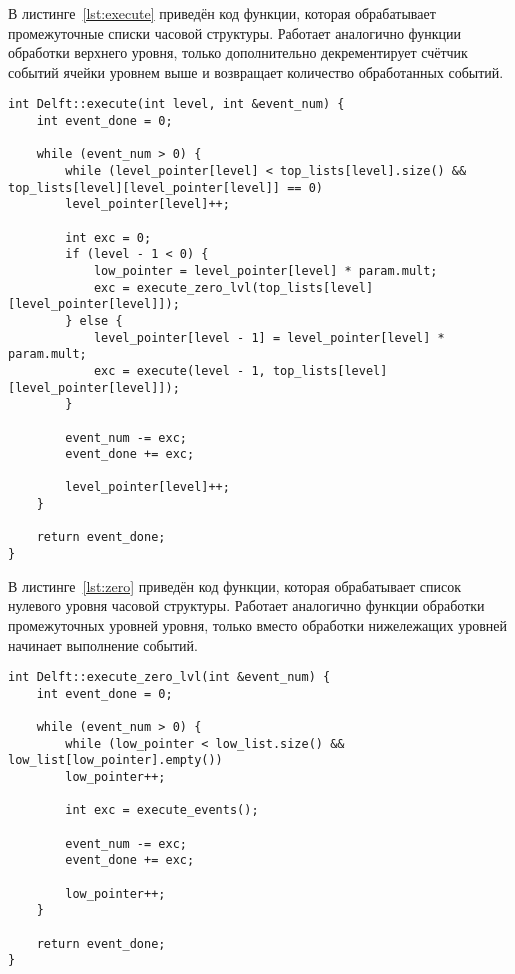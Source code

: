В листинге~\ref{lst:execute} приведён код функции, которая обрабатывает промежуточные списки часовой структуры. Работает аналогично функции обработки верхнего уровня, только дополнительно декрементирует счётчик событий ячейки уровнем выше и возвращает количество обработанных событий.

\begin{center}
	\captionsetup{justification=raggedright,singlelinecheck=off}
	\begin{lstlisting}[label=lst:execute,caption=Функция обработки промежуточных списков,showstringspaces=false]
int Delft::execute(int level, int &event_num) {
	int event_done = 0;
	
	while (event_num > 0) {
		while (level_pointer[level] < top_lists[level].size() && top_lists[level][level_pointer[level]] == 0)
		level_pointer[level]++;
		
		int exc = 0;
		if (level - 1 < 0) {
			low_pointer = level_pointer[level] * param.mult;
			exc = execute_zero_lvl(top_lists[level][level_pointer[level]]);
		} else {
			level_pointer[level - 1] = level_pointer[level] * param.mult;
			exc = execute(level - 1, top_lists[level][level_pointer[level]]);
		}
		
		event_num -= exc;
		event_done += exc;
		
		level_pointer[level]++;
	}
	
	return event_done;
}		
	\end{lstlisting}
\end{center}
\FloatBarrier

В листинге~\ref{lst:zero} приведён код функции, которая обрабатывает список нулевого уровня часовой структуры. Работает аналогично функции обработки промежуточных уровней уровня, только вместо обработки нижележащих уровней начинает выполнение событий.

\begin{center}
	\captionsetup{justification=raggedright,singlelinecheck=off}
	\begin{lstlisting}[label=lst:zero,caption=Функция обработки нижнего списка,showstringspaces=false]
int Delft::execute_zero_lvl(int &event_num) {
	int event_done = 0;
	
	while (event_num > 0) {
		while (low_pointer < low_list.size() && low_list[low_pointer].empty())
		low_pointer++;
		
		int exc = execute_events();
		
		event_num -= exc;
		event_done += exc;
		
		low_pointer++;
	}
	
	return event_done;
}	
	\end{lstlisting}
\end{center}
\FloatBarrier


